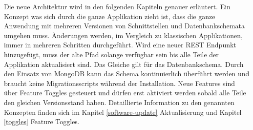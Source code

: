 Die neue Architektur wird in den folgenden Kapiteln genauer erläutert. Ein Konzept was sich durch die ganze Applikation zieht ist, dass die ganze Anwendung mit mehreren Versionen von Schnittstellen und Datenbankschemata umgehen muss. Änderungen werden, im Vergleich zu klassischen Applikationen, immer in mehreren Schritten durchgeführt. Wird eine neuer REST Endpunkt hinzugefügt, muss der alte Pfad solange verfügbar sein bis alle Teile der Applikation aktualisiert sind. Das Gleiche gilt für das Datenbankschema. Durch den Einsatz von MongoDB kann das Schema kontinuierlich überführt werden und braucht keine Migrationsscripts während der Installation. Neue Features sind über Feature Toggles gesteuert und dürfen erst aktiviert werden sobald alle Teile den gleichen Versionsstand haben. Detaillierte Information zu den genannten Konzepten finden sich im Kapitel \ref{software-update} Aktualisierung und Kapitel \ref{toggles} Feature Toggles.
\newpage